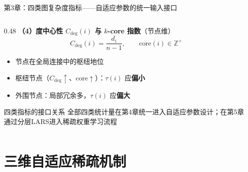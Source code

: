 \documentclass[aspectratio=169,9pt,xcolor=dvipsnames]{beamer}
\newcommand{\blue}[1]{\textcolor{mynavy}{#1}}
\begin{document}
\begin{frame}{第3章：四类图复杂度指标——自适应参数的统一输入接口}
\begin{columns}[T]
\begin{column}{0.48\textwidth}
      \vspace{0.2cm}
      \textbf{\blue{（4）度中心性 $C_{\mathrm{deg}}(i)$ 与 $k$-core 指数}}（节点维）
      \begin{equation*}
        C_{\mathrm{deg}}(i)=\frac{d_i}{n-1},\qquad
        \mathrm{core}(i)\in\mathbb{Z}^+
      \end{equation*}
                  \vspace{-0.1cm}
      \begin{itemize}
        \item 节点在全局连接中的枢纽地位
        \item 枢纽节点（$C_{\mathrm{deg}}\uparrow$、$\mathrm{core}\uparrow$）：$\tau(i)$ 应\textbf{偏小}
        \item 外围节点：局部冗余多，$\tau(i)$ 应\textbf{偏大}
      \end{itemize}

      \vspace{-0.15cm}
      \begin{alertblock}{四类指标的接口关系}
        全部四类统计量在第4章统一进入自适应参数设计；在第5章通过分层LARS进入稀疏权重学习流程
      \end{alertblock}
    \end{column}
  \end{columns}
\end{frame}

\section{三维自适应稀疏机制}
\end{document}
